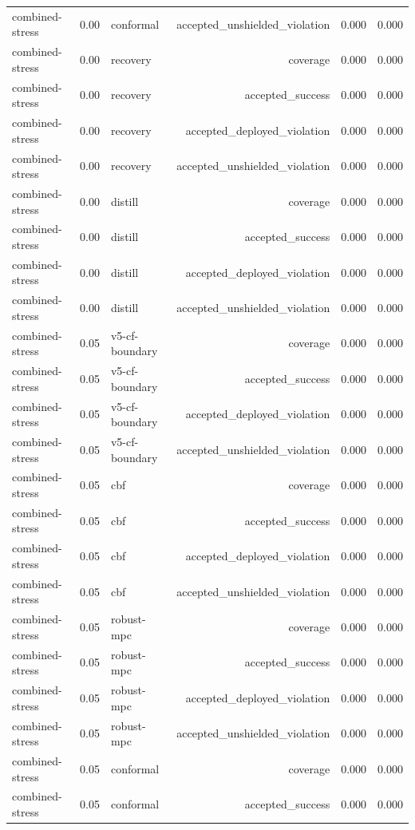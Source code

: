 \documentclass{article}
\begin{document}
\begin{longtable}{@{}lllrrr@{}}
combined-stress & 0.00 & conformal & accepted\_unshielded\_violation & 0.000 & 0.000 \\
combined-stress & 0.00 & recovery & coverage & 0.000 & 0.000 \\
combined-stress & 0.00 & recovery & accepted\_success & 0.000 & 0.000 \\
combined-stress & 0.00 & recovery & accepted\_deployed\_violation & 0.000 & 0.000 \\
combined-stress & 0.00 & recovery & accepted\_unshielded\_violation & 0.000 & 0.000 \\
combined-stress & 0.00 & distill & coverage & 0.000 & 0.000 \\
combined-stress & 0.00 & distill & accepted\_success & 0.000 & 0.000 \\
combined-stress & 0.00 & distill & accepted\_deployed\_violation & 0.000 & 0.000 \\
combined-stress & 0.00 & distill & accepted\_unshielded\_violation & 0.000 & 0.000 \\
combined-stress & 0.05 & v5-cf-boundary & coverage & 0.000 & 0.000 \\
combined-stress & 0.05 & v5-cf-boundary & accepted\_success & 0.000 & 0.000 \\
combined-stress & 0.05 & v5-cf-boundary & accepted\_deployed\_violation & 0.000 & 0.000 \\
combined-stress & 0.05 & v5-cf-boundary & accepted\_unshielded\_violation & 0.000 & 0.000 \\
combined-stress & 0.05 & cbf & coverage & 0.000 & 0.000 \\
combined-stress & 0.05 & cbf & accepted\_success & 0.000 & 0.000 \\
combined-stress & 0.05 & cbf & accepted\_deployed\_violation & 0.000 & 0.000 \\
combined-stress & 0.05 & cbf & accepted\_unshielded\_violation & 0.000 & 0.000 \\
combined-stress & 0.05 & robust-mpc & coverage & 0.000 & 0.000 \\
combined-stress & 0.05 & robust-mpc & accepted\_success & 0.000 & 0.000 \\
combined-stress & 0.05 & robust-mpc & accepted\_deployed\_violation & 0.000 & 0.000 \\
combined-stress & 0.05 & robust-mpc & accepted\_unshielded\_violation & 0.000 & 0.000 \\
combined-stress & 0.05 & conformal & coverage & 0.000 & 0.000 \\
combined-stress & 0.05 & conformal & accepted\_success & 0.000 & 0.000 \\

\end{longtable}
\end{document}
